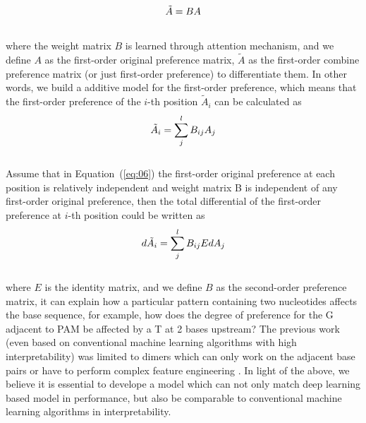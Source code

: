 \documentclass{bioinfo}
\begin{document}
\begin{equation}
\tilde{A}=BA\label{eq:05}\vspace*{-10pt}
\end{equation}\\
 where the weight matrix $B$ is learned through attention mechanism, and we define $A$ as the first-order original preference matrix, 
 $\tilde{A}$ as the first-order combine preference matrix (or just first-order preference) to differentiate them.
 In other words, we build a additive model for the first-order preference, 
 which means that the first-order preference of the $i$-th position $\tilde{A}_i$ can be calculated as
\begin{equation}
\tilde{A}_i=\sum_j^lB_{ij}A_j\label{eq:06}\vspace*{-10pt}
\end{equation}\\
 Assume that in Equation~(\ref{eq:06}) the first-order original preference at each position is relatively independent and weight matrix B is independent of any first-order original preference, 
 then the total differential of the first-order preference at $i$-th position could be written as
\begin{equation}
d\tilde{A}_i=\sum_j^lB_{ij}EdA_j\label{eq:07}\vspace*{-10pt}
\end{equation}\\
 where $E$ is the identity matrix, and we define $B$ as the second-order preference matrix, 
 it can explain how a particular pattern containing two nucleotides affects the base sequence, 
 for example, how does the degree of preference for the G adjacent to PAM be affected by a T at 2 bases upstream?
 The previous work (even based on conventional machine learning algorithms with high interpretability) 
 was limited to dimers which can only work on the adjacent base pairs \citep{Liu2019} 
 or have to perform complex feature engineering \citep{MuhammadRafid2020}.
 In light of the above, we believe it is essential to develope a model which can not only match deep learning based model in performance, 
 but also be comparable to conventional machine learning algorithms in interpretability.
\end{document}
